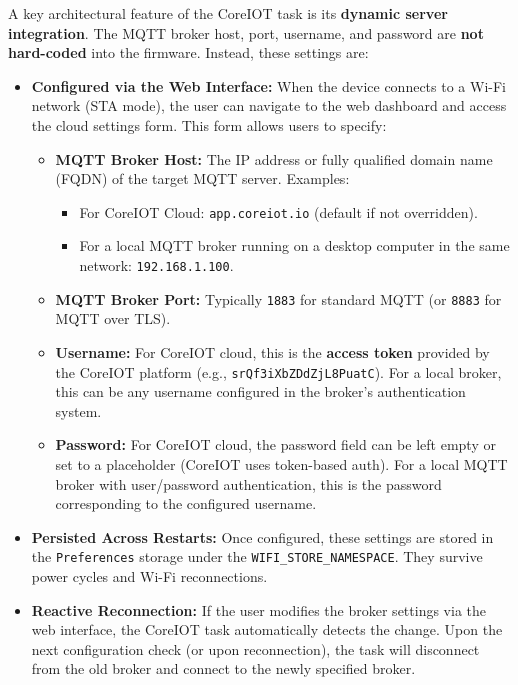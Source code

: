 A key architectural feature of the CoreIOT task is its \textbf{dynamic server integration}. The MQTT broker host, port, username, and password are \textbf{not hard-coded} into the firmware. Instead, these settings are:
\begin{itemize}
  \item \textbf{Configured via the Web Interface:} When the device connects to a Wi-Fi network (STA mode), the user can navigate to the web dashboard and access the cloud settings form. This form allows users to specify:
    \begin{itemize}
      \item \textbf{MQTT Broker Host:} The IP address or fully qualified domain name (FQDN) of the target MQTT server. Examples:
        \begin{itemize}
          \item For CoreIOT Cloud: \texttt{app.coreiot.io} (default if not overridden).
          \item For a local MQTT broker running on a desktop computer in the same network: \texttt{192.168.1.100}.
        \end{itemize}
      \item \textbf{MQTT Broker Port:} Typically \texttt{1883} for standard MQTT (or \texttt{8883} for MQTT over TLS).
      \item \textbf{Username:} For CoreIOT cloud, this is the \textbf{access token} provided by the CoreIOT platform (e.g., \texttt{srQf3iXbZDdZjL8PuatC}). For a local broker, this can be any username configured in the broker's authentication system.
      \item \textbf{Password:} For CoreIOT cloud, the password field can be left empty or set to a placeholder (CoreIOT uses token-based auth). For a local MQTT broker with user/password authentication, this is the password corresponding to the configured username.
    \end{itemize}
  \item \textbf{Persisted Across Restarts:} Once configured, these settings are stored in the \texttt{Preferences} storage under the \texttt{WIFI\_STORE\_NAMESPACE}. They survive power cycles and Wi-Fi reconnections.
  \item \textbf{Reactive Reconnection:} If the user modifies the broker settings via the web interface, the CoreIOT task automatically detects the change. Upon the next configuration check (or upon reconnection), the task will disconnect from the old broker and connect to the newly specified broker.
\end{itemize}

